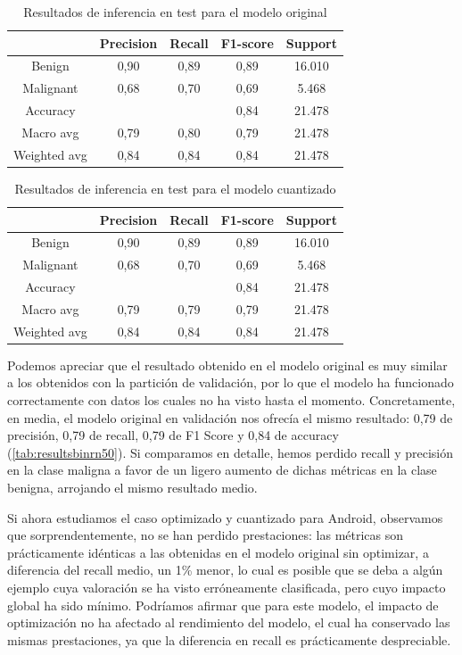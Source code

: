 \begin{table}[!ht]
	\centering
	\begin{tabular}{|c|c|c|c|c|}
		\hline
		~ & Precision & Recall & F1-score & Support \\ \hline
		Benign & 0,90 & 0,89 & 0,89 & 16.010 \\ 
		Malignant & 0,68 & 0,70 & 0,69 & 5.468 \\ \hline
		Accuracy & ~ & ~  & 0,84 & 21.478 \\ \hline
		Macro avg & 0,79 & 0,80 & 0,79 & 21.478 \\ 
		Weighted avg & 0,84 & 0,84 & 0,84 & 21.478 \\ \hline
	\end{tabular}
	\caption{Resultados de inferencia en test para el modelo original}
	\label{tab:bintestorig}
\end{table}



\begin{table}[!ht]
	\centering
	\begin{tabular}{|c|c|c|c|c|}
		\hline
		~ & Precision & Recall & F1-score & Support \\ \hline
		Benign & 0,90 & 0,89 & 0,89 & 16.010 \\ 
		Malignant & 0,68 & 0,70 & 0,69 & 5.468 \\ \hline
		Accuracy & ~ & ~  & 0,84 & 21.478 \\ \hline
		Macro avg & 0,79 & 0,79 & 0,79 & 21.478 \\ 
		Weighted avg & 0,84 & 0,84 & 0,84 & 21.478 \\ \hline
	\end{tabular}
	\caption{Resultados de inferencia en test para el modelo cuantizado}
	\label{tab:bintestquant}
\end{table}

Podemos apreciar que el resultado obtenido en el modelo original es muy similar a los obtenidos con la partición de validación, por lo que el modelo ha funcionado correctamente con datos los cuales no ha visto hasta el momento. Concretamente, en media, el modelo original en validación nos ofrecía el mismo resultado:  0,79 de precisión, 0,79 de recall,  0,79  de F1 Score y 0,84 de accuracy (\ref{tab:resultsbinrn50}). Si comparamos en detalle, hemos perdido recall y precisión en la clase maligna a favor de un ligero aumento de dichas métricas en la clase benigna, arrojando el mismo resultado medio. 

Si ahora estudiamos el caso optimizado y cuantizado para Android, observamos que sorprendentemente, no se han perdido prestaciones: las métricas son prácticamente idénticas a las obtenidas en el modelo original sin optimizar, a diferencia del recall medio, un 1\% menor, lo cual es posible que se deba a algún ejemplo cuya valoración se ha visto erróneamente clasificada, pero cuyo impacto global ha sido mínimo. Podríamos afirmar que para este modelo, el impacto de optimización no ha afectado al rendimiento del modelo, el cual ha conservado las mismas prestaciones, ya que la diferencia en recall es prácticamente despreciable.

